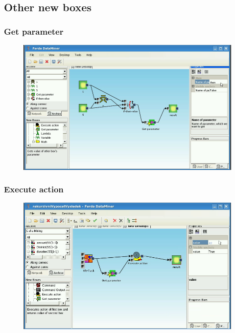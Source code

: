 \documentclass{article}
\begin{document}
\subsection{Other new boxes}
\subsubsection{Get parameter}
\begin{figure}
\includegraphics[width=12cm]{getParameter2.png}
	\caption{}
\end{figure}

\subsubsection{Execute action}
\begin{figure}
\includegraphics[width=12cm]{executeAction2.png}
	\caption{}
\end{figure}
\end{document}
